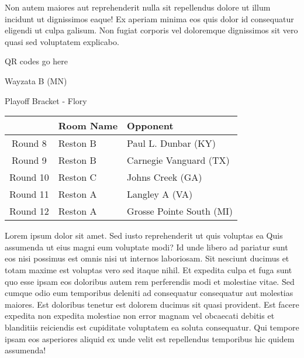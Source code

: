 \documentclass{article}%
\begin{document}
\newline%
Non autem maiores aut reprehenderit nulla sit repellendus dolore ut illum incidunt ut dignissimos eaque! Ex aperiam minima eos quis dolor id consequatur eligendi ut culpa galisum. Non fugiat corporis vel doloremque dignissimos sit vero quasi sed voluptatem explicabo.\newline%
\newline%
%
\vspace*{30pt}%
\begin{center}%
\begin{Huge}%
QR codes go here%
\end{Huge}%
\end{center}%
\newpage%
\begin{center}%
\begin{Huge}%
Wayzata B (MN)%
\end{Huge}%
\vspace*{8pt}%
\linebreak%
\begin{Large}%
Playoff Bracket {-} Flory%
\end{Large}%
\end{center}%
\begin{tabularx}{\textwidth}{|c|Y|Y|}%
\hline%
&Room Name&Opponent\\%
\hline%
Round 8&Reston B&Paul L. Dunbar (KY)\\%
Round 9&Reston B&Carnegie Vanguard (TX)\\%
Round 10&Reston C&Johns Creek (GA)\\%
Round 11&Reston A&Langley A (VA)\\%
Round 12&Reston A&Grosse Pointe South (MI)\\%
\hline%
\end{tabularx}%
\vspace*{8pt}%
\linebreak%
\newline%
\newline%
Lorem ipsum dolor sit amet. Sed iusto reprehenderit ut quis voluptas ea Quis assumenda ut eius magni eum voluptate modi? Id unde libero ad pariatur sunt eos nisi possimus est omnis nisi ut internos laboriosam. Sit nesciunt ducimus et totam maxime est voluptas vero sed itaque nihil. Et expedita culpa et fuga sunt quo esse ipsam eos doloribus autem rem perferendis modi et molestiae vitae.\newline%
\newline%
Sed cumque odio eum temporibus deleniti ad consequatur consequatur aut molestias maiores. Est doloribus tenetur est dolorem ducimus sit quasi provident. Est facere expedita non expedita molestiae non error magnam vel obcaecati debitis et blanditiis reiciendis est cupiditate voluptatem ea soluta consequatur. Qui tempore ipsam eos asperiores aliquid ex unde velit est repellendus temporibus hic quidem assumenda!\newline%
\end{document}
